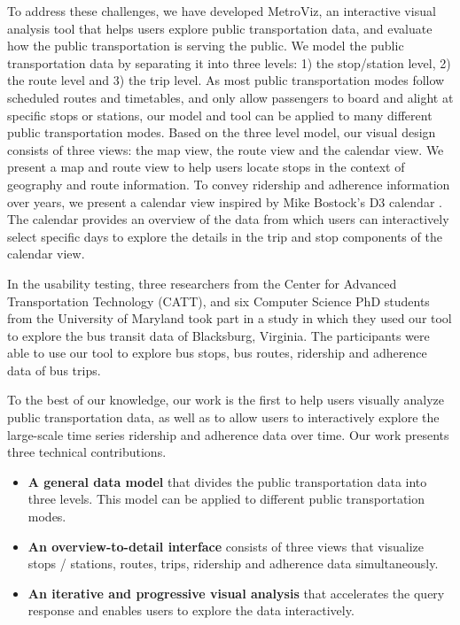 \documentclass[journal]{vgtc}                %
\begin{document}
To address these challenges, we have developed MetroViz, an interactive visual analysis tool that helps users explore public transportation data, and evaluate how the public transportation is serving the public. 
We model the public transportation data by separating it into three levels: 1) the stop/station level, 2) the route level and 3) the trip level. As most public transportation modes follow scheduled routes and timetables, and only allow passengers to board and alight at specific stops or stations, our model and tool can be applied to many different public transportation modes.
Based on the three level model, our visual design consists of three views: the map view, the route view and the calendar view.
We present a map and route view to help users locate stops in the context of geography and route information. To convey ridership and adherence information over years, we present a calendar view inspired by Mike Bostock's D3 calendar \cite{d3calendar}. The calendar provides an overview of the data from which users can interactively select specific days to explore the details in the trip and stop components of the calendar view.

In the usability testing, three researchers from the Center for Advanced Transportation Technology (CATT), and six Computer Science PhD students from the University of Maryland took part in a study in which they used our tool to explore the bus transit data of Blacksburg, Virginia. The participants were able to use our tool to explore bus stops, bus routes, ridership and adherence data of bus trips.

To the best of our knowledge, our work is the first to help users visually analyze public transportation data, as well as to allow users to interactively explore the large-scale time series ridership and adherence data over time. Our work presents three technical contributions.

\begin{itemize}
  \item \textbf{A general data model} that divides the public transportation data into three levels. This model can be applied to different public transportation modes.
  \item \textbf{An overview-to-detail interface} consists of three views that visualize stops / stations, routes, trips, ridership and adherence data simultaneously.
  \item \textbf{An iterative and progressive visual analysis} that accelerates the query response and enables users to explore the data interactively.
\end{itemize}
\end{document}
